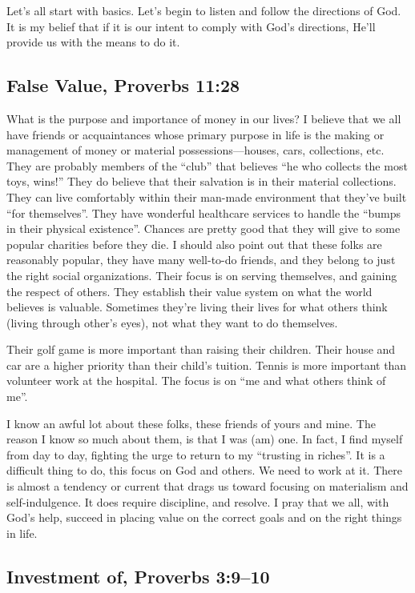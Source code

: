 \documentclass[12pt]{memoir}
\begin{document}
Let's all start with basics. Let's begin to listen and follow the
directions of God. It is my belief that if it is our intent to comply
with God's directions, He'll provide us with the means to do it.

\subsection{False Value, Proverbs 11:28}

What is the purpose and importance of money in our lives? I believe
that we all have friends or acquaintances whose primary purpose in
life is the making or management of money or material possessions---houses,
cars, collections, etc. They are probably members of the ``club''
that believes ``he who collects the most toys, wins!'' They do believe
that their salvation is in their material collections. They can live
comfortably within their man-made environment that they've built ``for
themselves''. They have wonderful healthcare services to handle the
``bumps in their physical existence''. Chances are pretty good that
they will give to some popular charities before they die. I should
also point out that these folks are reasonably popular, they have
many well-to-do friends, and they belong to just the right social
organizations. Their focus is on serving themselves, and gaining the
respect of others. They establish their value system on what the world
believes is valuable. Sometimes they're living their lives for what
others think (living through other's eyes), not what they want to
do themselves.

Their golf game is more important than raising their children. Their
house and car are a higher priority than their child's tuition. Tennis
is more important than volunteer work at the hospital. The focus is
on ``me and what others think of me''. 

I know an awful lot about these folks, these friends of yours and
mine. The reason I know so much about them, is that I was (am) one.
In fact, I find myself from day to day, fighting the urge to return
to my ``trusting in riches''. It is a difficult thing to do, this
focus on God and others. We need to work at it. There is almost a
tendency or current that drags us toward focusing on materialism and
self-indulgence. It does require discipline, and resolve. I pray that
we all, with God's help, succeed in placing value on the correct goals
and on the right things in life. 

\subsection{Investment of, Proverbs 3:9--10}
\end{document}
